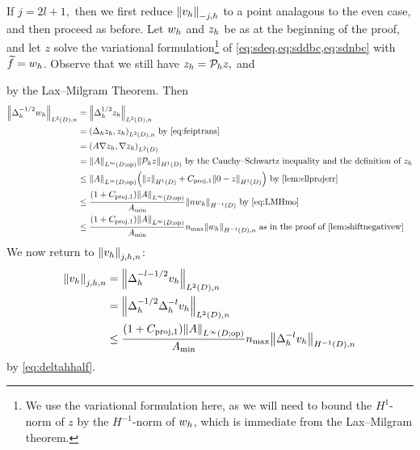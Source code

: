 If $j=2l+1,$ then we first reduce $\Nfn{-j,h}{\vh}$ to a point analagous to the even case, and then proceed as before. Let $w_{h}$ and $z_{h}$ be as at the beginning of the proof, and let $z$ solve the variational formulation\footnote{We use the variational formulation here, as we will need to bound the $H^1$-norm of $z$ by the $H^{-1}$-norm of $w_{h}$, which is immediate from the Lax--Milgram theorem.}  of \cref{eq:sdeq,eq:sddbc,eq:sdnbc} with $\widetilde{f} = w_{h}$. Observe that we still have $z_{h} = \mathcal P_{h} z,$ and

\beq\label{eq:LMHmo}
 \leq {} 
\eeq
by the Lax--Milgram Theorem. Then
\begin{align}
\NLtDn{\Deltah^{-1/2}\wh} &= \NLtDn{\Deltah^{1/2} \zh}\nonumber\\
&= \IPLtDn{\Deltah \zh}{\zh} \text{ by \cref{eq:feiptrans}}\\
&= \IPLtD{A \grad \zh}{\grad \zh}\nonumber\\
&= \NLiDop{A} \NHoD{\Ph z}\nonumber\text{ by the Cauchy--Schwartz inequality and the definition of } \zh\\
&\leq \NLiDop{A}\mleft(\NHoD{z} + \Cprojfn{1}\NHoD{0 - z}\mright) \text{ by \cref{lem:ellprojerr}}\nonumber\\
&\leq \frac{\mleft(1+\Cprojfn{1}\mright)\NLiDop{A}}{\Amin}  \NHmoD{n\wh}\text{ by \cref{eq:LMHmo}}\label{eq:deltahhalf}\\
&\leq \frac{\mleft(1+\Cprojfn{1}\mright)\NLiDop{A}}{\Amin}\nmax  \NHnfn{-1}{D}{\wh}\text{ as in the proof of \cref{lem:shiftnegativew}}\nonumber
\end{align}
We now return to $\Njhn{\vh}$:
\begin{align*}
  \Nfn{j,h,n}{\vh} &= \NLtDn{\Deltah^{-l-1/2} \vh}\\
  &= \NLtDn{\Deltah^{-1/2} \Deltah^{-l} \vh}\\
&\leq \frac{\mleft(1+\Cprojfn{1}\mright)\NLiDop{A}}{\Amin}\nmax\NHnfn{-1}{D}{\Deltah^{-l}\vh}
\end{align*}
by \cref{eq:deltahhalf}.

